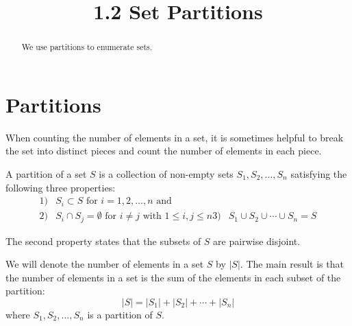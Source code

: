 \documentclass[handout]{ximera}
\title{1.2 Set Partitions}
\begin{document}
\begin{abstract}
We use partitions to enumerate sets.
\end{abstract}

\maketitle

\section{Partitions}

When counting the number of elements in a set, it is sometimes helpful to break the set into
distinct pieces and count the number of elements in each piece. 

\begin{definition}[Partition]
A partition of a set $S$ is a collection of non-empty sets $S_1, S_2, ..., S_n$ satisfying the 
following three properties:
\begin{align*}
1) & S_i \subset S \text{ for } i = 1, 2, ..., n \text{ and} \\
2) & S_i \cap S_j = \emptyset \text{ for } i \neq j \text{ with } 1 \leq i,j \leq n
3) & S_1 \cup S_2 \cup \cdots \cup S_n = S
\end{align*}
\end{definition}

\begin{image}
\end{image}
\begin{remark}
The second property states that the subsets of $S$ are pairwise disjoint.
\end{remark}

We will denote the number of elements in a set $S$ by $|S|$. The main result
 is that the number of elements in a set is the sum of the elements in each 
subset of the partition:
\[
|S| = |S_1| + |S_2|+ \cdots + |S_n|
\]
where $S_1, S_2, ..., S_n$ is a partition of $S$.
\end{document}
